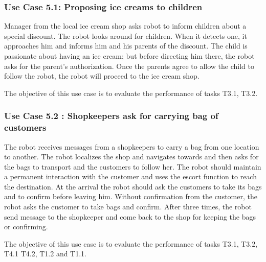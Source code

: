 \subsubsection*{Use Case 5.1: Proposing ice creams to children} 
Manager from the local ice cream shop asks robot to inform children about
a special discount. The robot looks around for children. When it detects
one, it approaches him and informs him and his parents of the discount. The child
is passionate about having an ice cream; but before directing him
there, the robot asks for the parent's authorization. Once the parents
agree to allow the child to follow the robot, the robot will proceed
to the ice cream shop. 

The objective of this use case is to evaluate the performance of tasks T3.1, T3.2.

\subsubsection*{Use Case 5.2 : Shopkeepers ask for carrying bag of customers}
The robot receives messages from a shopkeepers to carry a bag from one location to another. The robot localizes the shop and navigates towards and then asks for the bags to transport and the customers to follow her. The robot should maintain a permanent interaction with the customer and uses the escort function to reach the destination. At the arrival the robot should ask the customers to take its bags and to confirm before leaving him. Without confirmation from the customer, the robot asks the customer to take bags and confirm. After three times, the robot send message to the shopkeeper and come back to the shop for keeping the bags or confirming.

The objective of this use case is to evaluate the performance of tasks T3.1, T3.2, T4.1 T4.2, T1.2 and T1.1.



